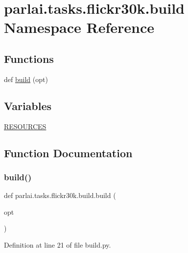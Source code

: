 \hypertarget{namespaceparlai_1_1tasks_1_1flickr30k_1_1build}{}\section{parlai.\+tasks.\+flickr30k.\+build Namespace Reference}
\label{namespaceparlai_1_1tasks_1_1flickr30k_1_1build}
\subsection*{Functions}
\begin{DoxyCompactItemize}
\item 
def \hyperlink{namespaceparlai_1_1tasks_1_1flickr30k_1_1build_a45b58a1c8d68443baba41a4f9290967d}{build} (opt)
\end{DoxyCompactItemize}
\subsection*{Variables}
\begin{DoxyCompactItemize}
\item 
\hyperlink{namespaceparlai_1_1tasks_1_1flickr30k_1_1build_a3231e5ad00e54750b7e231a03b8f7ef9}{R\+E\+S\+O\+U\+R\+C\+ES}
\end{DoxyCompactItemize}


\subsection{Function Documentation}
\mbox{\label{namespaceparlai_1_1tasks_1_1flickr30k_1_1build_a45b58a1c8d68443baba41a4f9290967d}} 
\subsubsection{\texorpdfstring{build()}{build()}}
{\footnotesize\ttfamily def parlai.\+tasks.\+flickr30k.\+build.\+build (\begin{DoxyParamCaption}\item[{}]{opt }\end{DoxyParamCaption})}



Definition at line 21 of file build.\+py.


